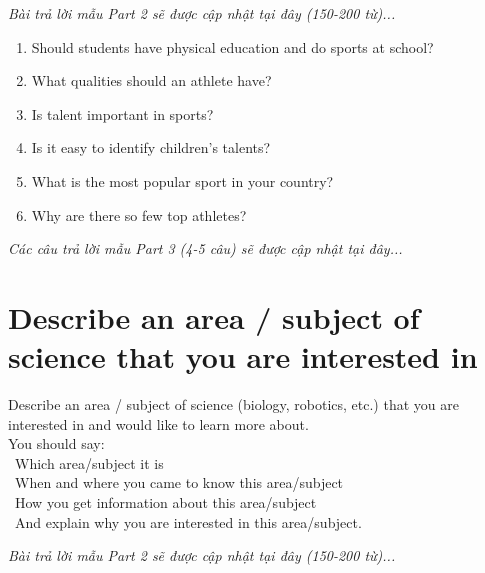 \vspace{1em}
\textit{Bài trả lời mẫu Part 2 sẽ được cập nhật tại đây (150-200 từ)...}
\vspace{2em}

\begin{ieltsprompt}
\begin{enumerate}[itemsep=4pt]
    \item Should students have physical education and do sports at school?
    \item What qualities should an athlete have?
    \item Is talent important in sports?
    \item Is it easy to identify children's talents?
    \item What is the most popular sport in your country?
    \item Why are there so few top athletes?
\end{enumerate}
\end{ieltsprompt}

\vspace{1em}
\textit{Các câu trả lời mẫu Part 3 (4-5 câu) sẽ được cập nhật tại đây...}
\vspace{2em}

\section{Describe an area / subject of science that you are interested in}
\begin{ieltsprompt}
Describe an area / subject of science (biology, robotics, etc.) that you are interested in and would like to learn more about. \\
You should say: \\
\textbullet\ Which area/subject it is \\
\textbullet\ When and where you came to know this area/subject \\
\textbullet\ How you get information about this area/subject \\
\textbullet\ And explain why you are interested in this area/subject. \\
\end{ieltsprompt}

\vspace{1em}
\textit{Bài trả lời mẫu Part 2 sẽ được cập nhật tại đây (150-200 từ)...}
\vspace{2em}


